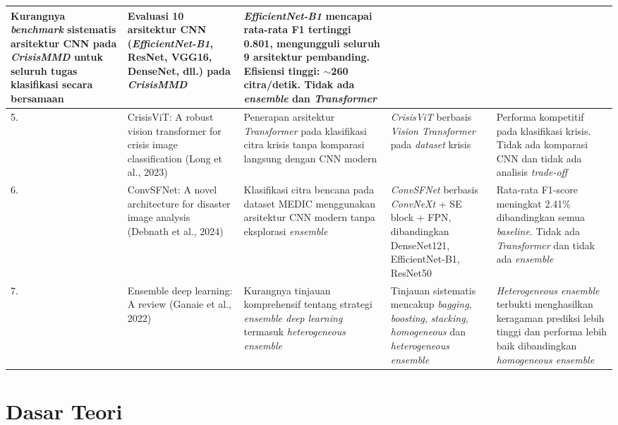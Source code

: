 \begin{longtable}{|b{}|p{}|p{}
|p{}|p{}|}
    Kurangnya \textit{benchmark} sistematis arsitektur CNN pada
    \textit{CrisisMMD} untuk seluruh tugas klasifikasi secara
    bersamaan &
    Evaluasi 10 arsitektur CNN (\textit{EfficientNet-B1}, ResNet,
    VGG16, DenseNet, dll.) pada \textit{CrisisMMD} &
    \textit{EfficientNet-B1} mencapai rata-rata F1 tertinggi 0.801,
    mengungguli seluruh 9 arsitektur pembanding. Efisiensi tinggi:
    $\sim$260 citra/detik. Tidak ada \textit{ensemble} dan
    \textit{Transformer} \\
    \hline
    5. &
    CrisisViT: A robust vision transformer for crisis image
    classification (Long et al., 2023) \cite{long2023crisisvit} &
    Penerapan arsitektur \textit{Transformer} pada klasifikasi citra
    krisis tanpa komparasi langsung dengan CNN modern &
    \textit{CrisisViT} berbasis \textit{Vision Transformer} pada
    \textit{dataset} krisis &
    Performa kompetitif pada klasifikasi krisis. Tidak ada komparasi
    CNN dan tidak ada analisis \textit{trade-off} \\
    \hline
    6. &
    ConvSFNet: A novel architecture for disaster image analysis
    (Debnath et al., 2024) \cite{debnath2024convsfnet} &
    Klasifikasi citra bencana pada dataset MEDIC menggunakan arsitektur
    CNN modern tanpa eksplorasi \textit{ensemble} &
    \textit{ConvSFNet} berbasis \textit{ConvNeXt} + SE block + FPN,
    dibandingkan DenseNet121, EfficientNet-B1, ResNet50 &
    Rata-rata F1-score meningkat 2.41\% dibandingkan semua
    \textit{baseline}. Tidak ada \textit{Transformer} dan tidak ada
    \textit{ensemble} \\
    \hline
    7. &
    Ensemble deep learning: A review (Ganaie et al., 2022)
    \cite{ganaie2022ensemble} &
    Kurangnya tinjauan komprehensif tentang strategi
    \textit{ensemble deep learning} termasuk \textit{heterogeneous
    ensemble} &
    Tinjauan sistematis mencakup \textit{bagging}, \textit{boosting},
    \textit{stacking}, \textit{homogeneous} dan \textit{heterogeneous
    ensemble} &
    \textit{Heterogeneous ensemble} terbukti menghasilkan keragaman
    prediksi lebih tinggi dan performa lebih baik dibandingkan
    \textit{homogeneous ensemble} \\
    \hline
\end{longtable}


\section{Dasar Teori} \label{II.Teori}

